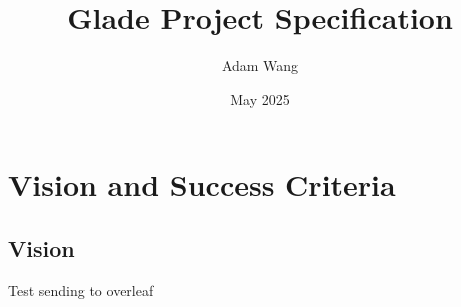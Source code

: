 \documentclass{article}
\title{Glade Project Specification}
\author{Adam Wang}
\date{May 2025}
\begin{document}
\maketitle

\section{Vision and Success Criteria}

\subsection{Vision}

Test sending to overleaf
\end{document}
